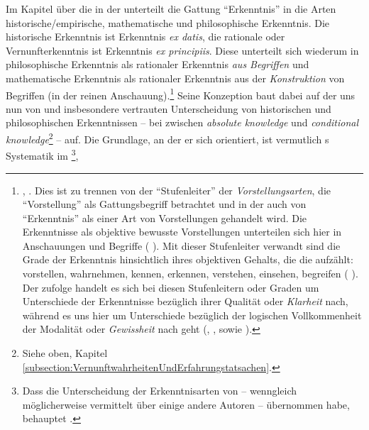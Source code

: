 Im Kapitel über die  in der
 unterteilt  die Gattung
\enquote{Erkenntnis} in die Arten historische/empirische, mathematische und philosophische
Erkenntnis. Die historische Erkenntnis ist Erkenntnis \emph{ex datis}, die
rationale oder Vernunfterkenntnis ist Erkenntnis \emph{ex principiis}. Diese
unterteilt sich wiederum in philosophische Erkenntnis als rationaler Erkenntnis
\emph{aus Begriffen} und mathematische Erkenntnis als rationaler Erkenntnis aus
der \emph{Konstruktion} von Begriffen (in der reinen
Anschauung).\footnote{\cite[Vgl.][B 863--865]{Kant:KritikderreinenVernunft2003},
\cite[][III: 540.23--542.2]{Kant:GesammelteWerke1900ff.}. Dies ist zu trennen
von der \enquote{Stufenleiter} der \emph{Vorstellungsarten}, die
\enquote{Vorstellung} als Gattungsbegriff betrachtet und in der auch von
\enquote{Erkenntnis} als einer Art von Vorstellungen gehandelt wird. Die
Erkenntnisse als objektive bewusste Vorstellungen unterteilen sich hier in
Anschauungen und Begriffe \mkbibparens{\cite[vgl.][B
376\,f.,]{Kant:KritikderreinenVernunft2003} \cite[][III:
249.37--250.14]{Kant:GesammelteWerke1900ff.}}. Mit dieser Stufenleiter verwandt
sind die Grade der Erkenntnis hinsichtlich ihres objektiven Gehalts, die die
 aufzählt: vorstellen, wahrnehmen, kennen, erkennen,
verstehen, einsehen, begreifen
\mkbibparens{\cite[vgl.][A 96\,f.,]{Kant:ImmanuelKantsLogik1977}
\cite[][IX: 64.29--65.24]{Kant:GesammelteWerke1900ff.}}. Der
 zufolge handelt es sich bei diesen Stufenleitern oder
Graden um Unterschiede der Erkenntnisse bezüglich ihrer Qualität oder
\emph{Klarheit} nach, während es uns hier um Unterschiede bezüglich der
logischen Vollkommenheit der Modalität oder \emph{Gewissheit} nach geht
\mkbibparens{\cite[vgl.][A 107]{Kant:ImmanuelKantsLogik1977},
\cite[][IX: 70.27--35]{Kant:GesammelteWerke1900ff.}, sowie \cite[][A
96\,f.,]{Kant:ImmanuelKantsLogik1977} \cite[][IX:
64.29--65.24]{Kant:GesammelteWerke1900ff.}}.} Seine Konzeption baut dabei auf
der uns nun von  und insbesondere
 vertrauten Unterscheidung von
historischen und philosophischen Erkenntnissen -- bei
 zwischen \emph{absolute knowledge} und
\emph{conditional knowledge}\footnote{Siehe oben, Kapitel
\ref{subsection:VernunftwahrheitenUndErfahrungstatsachen}.} -- auf.
Die Grundlage, an der er sich orientiert, ist vermutlich
s Systematik im \footnote{Dass  die
Unterscheidung der Erkenntnisarten von
 -- wenngleich möglicherweise
vermittelt über einige andere Autoren -- übernommen habe, behauptet
\parencite[vgl.][\pno~12\,f.]{Albrecht:KantsKritikderhistorischenErkenntnis--einBekenntniszuWolff?1982}.},
